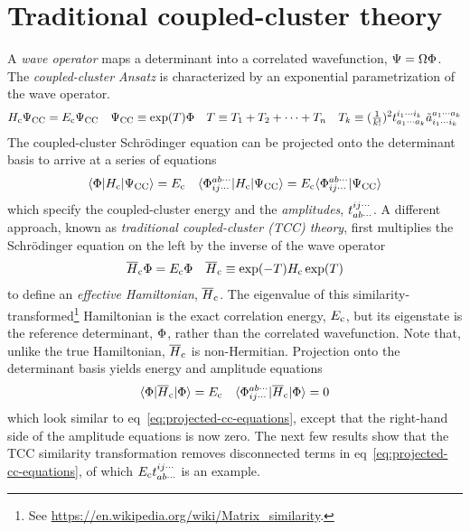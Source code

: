 \documentclass[11pt]{article}
\numberwithin{equation}{section}
\begin{document}
\setlength{\abovedisplayskip}{3pt}
\setlength{\belowdisplayskip}{3pt}

\setcounter{section}{4}
\section{Traditional coupled-cluster theory}

\begin{dfn}\label{dfn:cc-effective-hamiltonian}
A \textit{wave operator} maps a determinant into a correlated wavefunction, $\Psi =\Omega \Phi $.
The \textit{coupled-cluster Ansatz} is characterized by an exponential parametrization of the wave operator.
\begin{align}
\label{eq:cc-effective-hamiltonian}
  H_{\mathrm{c}}\Psi _{\mathrm{CC}}
=
  E_{\mathrm{c}}\Psi _{\mathrm{CC}}
&&
  \Psi _{\mathrm{CC}}
\equiv
  \mathrm{exp}(T)
  \Phi 
&&
  T
\equiv
  T_1
+
  T_2
+
  \cdots
+
  T_n
&&
  T_k
\equiv
  (\tfrac{1}{k!})^2
  t_{a_1\cdots a_k}^{i_1\cdots i_k}
  \tilde{a}^{a_1\cdots a_k}_{i_1\cdots i_k}
\end{align}
The coupled-cluster Schr\"odinger equation can be projected onto the determinant basis to arrive at a series of equations
\begin{align}
\label{eq:projected-cc-equations}
  \langle\Phi |H_{\mathrm{c}}|\Psi _{\mathrm{CC}}\rangle
=
  E_{\mathrm{c}}
&&
  \langle\Phi _{ij\cdots}^{ab\cdots}|H_{\mathrm{c}}|\Psi _{\mathrm{CC}}\rangle
=
  E_{\mathrm{c}}
  \langle\Phi _{ij\cdots}^{ab\cdots}|\Psi _{\mathrm{CC}}\rangle
\end{align}
which specify the coupled-cluster energy and the \textit{amplitudes}, $t_{ab\cdots}^{ij\cdots}$.
A different approach, known as \textit{traditional coupled-cluster (TCC) theory}, first multiplies the Schr\"odinger equation on the left by the inverse of the wave operator
\begin{align}
  \overline{H}_{\mathrm{c}}
  \Phi 
=
  E_{\mathrm{c}}
  \Phi 
&&
  \overline{H}_{\mathrm{c}}
\equiv
  \mathrm{exp}(-T)
  H_{\mathrm{c}}\,
  \mathrm{exp}(T)
\end{align}
to define an \textit{effective Hamiltonian}, $\overline{H}_{\mathrm{c}}$.
The eigenvalue of this similarity-transformed\footnote{See \url{https://en.wikipedia.org/wiki/Matrix_similarity}.} Hamiltonian is the exact correlation energy, $E_{\mathrm{c}}$, but its eigenstate is the reference determinant, $\Phi $, rather than the correlated wavefunction.
Note that, unlike the true Hamiltonian, $\overline{H}_{\mathrm{c}}$ is non-Hermitian.
Projection onto the determinant basis yields energy and amplitude equations
\begin{align}
\label{eq:traditional-cc-equations}
  \langle\Phi |\overline{H}_{\mathrm{c}}|\Phi \rangle
=
  E_{\mathrm{c}}
&&
  \langle\Phi _{ij\cdots}^{ab\cdots}|\overline{H}_{\mathrm{c}}|\Phi \rangle
=
  0
\end{align}
which look similar to eq~\ref{eq:projected-cc-equations}, except that the right-hand side of the amplitude equations is now zero.
The next few results show that the TCC similarity transformation removes disconnected terms in eq~\ref{eq:projected-cc-equations}, of which $E_{\mathrm{c}}t_{ab\cdots}^{ij\cdots}$ is an example.
\end{dfn}
\end{document}
